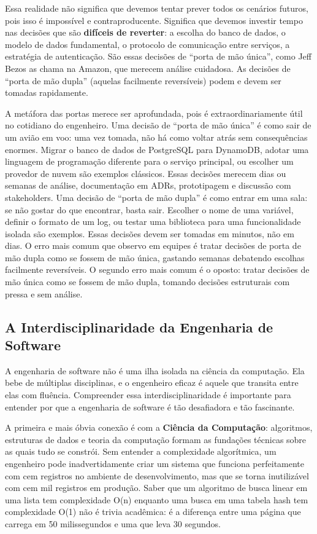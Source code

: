 Essa realidade não significa que devemos tentar prever todos os cenários
futuros, pois isso é impossível e contraproducente. Significa que devemos
investir tempo nas decisões que são \textbf{difíceis de reverter}: a
escolha do banco de dados, o modelo de dados fundamental, o protocolo
de comunicação entre serviços, a estratégia de autenticação. São essas
decisões de ``porta de mão única'', como Jeff Bezos as chama na Amazon,
que merecem análise cuidadosa. As decisões de ``porta de mão dupla''
(aquelas facilmente reversíveis) podem e devem ser tomadas rapidamente.

A metáfora das portas merece ser aprofundada, pois é extraordinariamente
útil no cotidiano do engenheiro. Uma decisão de ``porta de mão única''
é como sair de um avião em voo: uma vez tomada, não há como voltar atrás
sem consequências enormes. Migrar o banco de dados de PostgreSQL para
DynamoDB, adotar uma linguagem de programação diferente para o serviço
principal, ou escolher um provedor de nuvem são exemplos clássicos.
Essas decisões merecem dias ou semanas de análise, documentação em ADRs,
prototipagem e discussão com stakeholders. Uma decisão de ``porta de
mão dupla'' é como entrar em uma sala: se não gostar do que encontrar,
basta sair. Escolher o nome de uma variável, definir o formato de um
log, ou testar uma biblioteca para uma funcionalidade isolada são
exemplos. Essas decisões devem ser tomadas em minutos, não em dias.
O erro mais comum que observo em equipes é tratar decisões de porta de
mão dupla como se fossem de mão única, gastando semanas debatendo
escolhas facilmente reversíveis. O segundo erro mais comum é o oposto:
tratar decisões de mão única como se fossem de mão dupla, tomando
decisões estruturais com pressa e sem análise.

\subsection{A Interdisciplinaridade da Engenharia de Software}

A engenharia de software não é uma ilha isolada na ciência da computação.
Ela bebe de múltiplas disciplinas, e o engenheiro eficaz é aquele que
transita entre elas com fluência. Compreender essa interdisciplinaridade
é importante para entender por que a engenharia de software é tão
desafiadora e tão fascinante.

A primeira e mais óbvia conexão é com a \textbf{Ciência da Computação}:
algoritmos, estruturas de dados e teoria da computação formam as fundações
técnicas sobre as quais tudo se constrói. Sem entender a complexidade
algorítmica, um engenheiro pode inadvertidamente criar um sistema que
funciona perfeitamente com cem registros no ambiente de desenvolvimento,
mas que se torna inutilizável com cem mil registros em produção. Saber
que um algoritmo de busca linear em uma lista tem complexidade O(n)
enquanto uma busca em uma tabela hash tem complexidade O(1) não é trivia
acadêmica: é a diferença entre uma página que carrega em 50
milissegundos e uma que leva 30 segundos.

